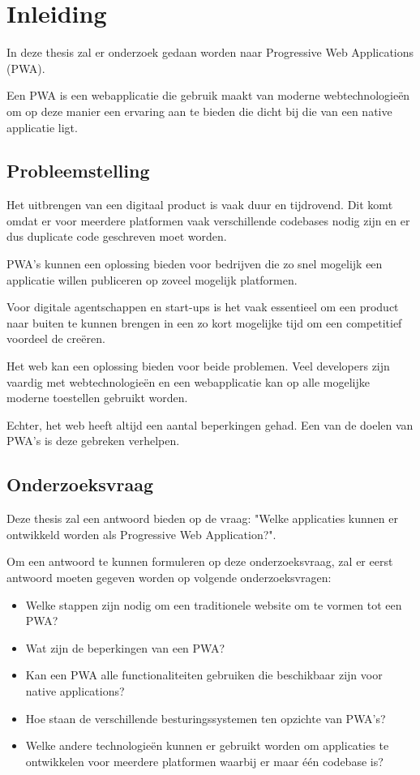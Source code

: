 

\chapter{Inleiding}
\label{ch:inleiding}

In deze thesis zal er onderzoek gedaan worden naar Progressive Web Applications (PWA).

Een PWA is een webapplicatie die gebruik maakt van moderne webtechnologieën om op deze manier een ervaring aan te bieden die dicht bij die van een native applicatie ligt.

\section{Probleemstelling}

	Het uitbrengen van een digitaal product is vaak duur en tijdrovend. Dit komt omdat er voor meerdere platformen vaak verschillende codebases nodig zijn en er dus duplicate code geschreven moet worden. 
	
	PWA's kunnen een oplossing bieden voor bedrijven die zo snel mogelijk een applicatie willen publiceren op zoveel mogelijk platformen.
	
	Voor digitale agentschappen en start-ups is het vaak essentieel om een product naar buiten te kunnen brengen in een zo kort mogelijke tijd om een competitief voordeel de creëren. 
	
	Het web kan een oplossing bieden voor beide problemen. Veel developers zijn vaardig met webtechnologieën en een webapplicatie kan op alle mogelijke moderne toestellen gebruikt worden. 
	
	Echter, het web heeft altijd een aantal beperkingen gehad. Een van de doelen van PWA's is deze gebreken verhelpen.


\section{Onderzoeksvraag}


	Deze thesis zal een antwoord bieden op de vraag: "Welke applicaties kunnen er ontwikkeld worden als Progressive Web Application?".
	
	Om een antwoord te kunnen formuleren op deze onderzoeksvraag, zal er eerst antwoord moeten gegeven worden op volgende onderzoeksvragen:
	
	\begin{itemize}
		  \item Welke stappen zijn nodig om een traditionele website om te vormen tot een PWA?
		  \item Wat zijn de beperkingen van een PWA?
		  \item Kan een PWA alle functionaliteiten gebruiken die beschikbaar zijn voor native applications?
		  \item Hoe staan de verschillende besturingssystemen ten opzichte van PWA's?
		  \item Welke andere technologieën kunnen er gebruikt worden om applicaties te ontwikkelen voor meerdere platformen waarbij er maar één codebase is?
	  \end{itemize}

